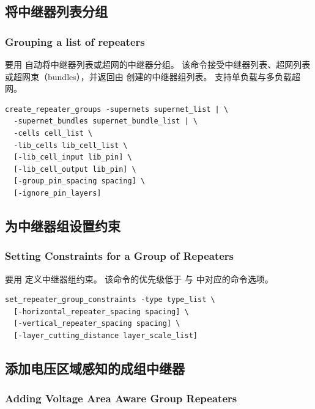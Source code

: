 \subsection{将中继器列表分组}
\subsubsection*{Grouping a list of repeaters}

要用  自动将中继器列表或超网的中继器分组。
该命令接受中继器列表、超网列表或超网束（bundles），并返回由  创建的中继器组列表。
支持单负载与多负载超网。
\begin{lstlisting}
create_repeater_groups -supernets supernet_list | \
  -supernet_bundles supernet_bundle_list | \
  -cells cell_list \
  -lib_cells lib_cell_list \
  [-lib_cell_input lib_pin] \
  [-lib_cell_output lib_pin] \
  [-group_pin_spacing spacing] \
  [-ignore_pin_layers]
\end{lstlisting}

\subsection{为中继器组设置约束}
\subsubsection*{Setting Constraints for a Group of Repeaters}

要用  定义中继器组约束。
该命令的优先级低于  与  中对应的命令选项。
\begin{lstlisting}
set_repeater_group_constraints -type type_list \
  [-horizontal_repeater_spacing spacing] \
  [-vertical_repeater_spacing spacing] \
  [-layer_cutting_distance layer_scale_list]
\end{lstlisting}

\subsection{添加电压区域感知的成组中继器}
\subsubsection*{Adding Voltage Area Aware Group Repeaters}

